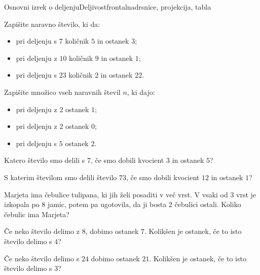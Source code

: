 \begin{priprava}{4}{}{Osnovni izrek o deljenju}{Deljivost}{frontalna}{drsnice, projekcija, tabla}
    \begin{naloga}
        Zapišite naravno število, ki da:
        \begin{itemize}
            \item pri deljenju s $7$ količnik $5$ in ostanek $3$; 
            \item pri deljenju z $10$ količnik $9$ in ostanek $1$; 
            \item pri deljenju s $23$ količnik $2$ in ostanek $22$. 
        \end{itemize}
    \end{naloga}

    \begin{naloga}
        Zapišite množico vseh naravnih števil $n$, ki dajo:
        \begin{itemize}
            \item pri deljenju z $2$ ostanek $1$; 
            \item pri deljenju z $2$ ostanek $0$; 
            \item pri deljenju s $5$ ostanek $2$. 
        \end{itemize}
    \end{naloga}



    \begin{naloga}
        Katero število smo delili s $7$, če smo dobili kvocient $3$ in ostanek $5$? 
    \end{naloga}

    \begin{naloga}
        S katerim številom smo delili število $73$, če smo dobili kvocient $12$ in ostanek $1$? 
    \end{naloga}

    \begin{naloga}
        Marjeta ima čebulice tulipana, ki jih želi posaditi v več vrst. 
        V vsaki od $3$ vrst je izkopala po $8$ jamic, potem pa ugotovila, da ji bosta $2$ čebulici ostali.
        Koliko čebulic ima Marjeta?  
    \end{naloga}



    \begin{naloga}
        Če neko število delimo z $8$, dobimo ostanek $7$. Kolikšen je ostanek, če to isto število delimo s $4$? 
    \end{naloga}

    \begin{naloga}
        Če neko število delimo s $24$ dobimo ostanek $21$. Kolikšen je ostanek, če to isto število delimo s $3$? 
    \end{naloga}
            
 


\end{priprava}